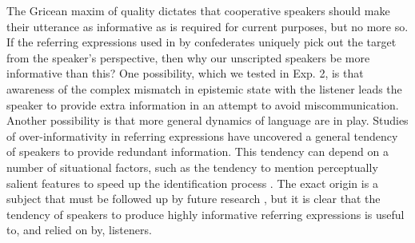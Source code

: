 \documentclass[manuscript]{stjour}
\begin{document}
The Gricean maxim of quality dictates that cooperative speakers should make their utterance as informative as is required for current purposes, but no more so. If the referring expressions used in by confederates uniquely pick out the target from the speaker's perspective, then why our unscripted speakers be more informative than this? 
One possibility, which we tested in Exp. 2, is that awareness of the complex mismatch in epistemic state with the listener leads the speaker to provide extra information in an attempt to avoid miscommunication.
Another possibility is that more general dynamics of language are in play.
Studies of over-informativity in referring expressions have uncovered a general tendency of speakers to provide redundant information.
This tendency can depend on a number of situational factors, such as the tendency to mention perceptually salient features to speed up the identification process  \cite{KoolenGattGoudbeekKrahmer11_Overspecification}. 
The exact origin is a subject that must be followed up by future research \cite[e.g.]{GannBarr14_AudienceDesign}, but it is clear that the tendency of speakers to produce highly informative referring expressions is useful to, and relied on by, listeners. 


\end{document}
